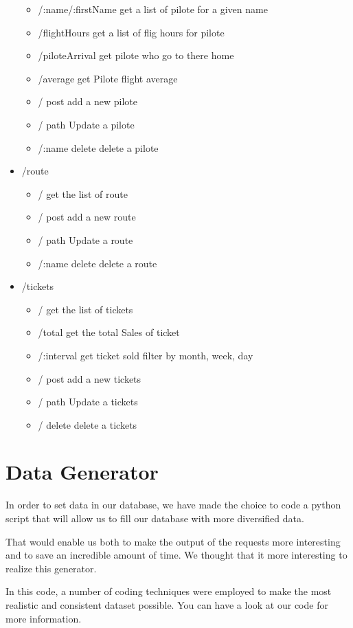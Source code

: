 \documentclass{article}
\begin{document}
\begin{itemize}
\begin{itemize}
                \item /:name/:firstName get a list of pilote for a given name
                \item /flightHours get a list of flig hours for pilote
                \item /piloteArrival get pilote who go to there home
                \item /average get Pilote flight average
                \item / post add a new pilote  
                \item / path Update a pilote
                \item /:name delete delete a pilote
            \end{itemize}
        \item /route
            \begin{itemize}
                \item / get the list of route
                \item / post add a new route  
                \item / path Update a route
                \item /:name delete delete a route
            \end{itemize}
        \item /tickets
            \begin{itemize}
                \item / get the list of tickets
                \item /total get the total Sales of ticket
                \item /:interval get ticket sold filter by month, week, day
                \item / post add a new tickets  
                \item / path Update a tickets
                \item / delete delete a tickets
            \end{itemize}
    \end{itemize}

    \section{Data Generator}
    
    In order to set data in our database, we have made the choice to code a python script that will allow us to fill our database with more diversified data. \newline

    That would enable us both to make the output of the requests more interesting and to save an incredible amount of time. We thought that it more interesting to realize this generator. \newline
    
    In this code, a number of coding techniques were employed to make the most realistic and consistent dataset possible. You can have a look at our code for more information.
\end{document}
